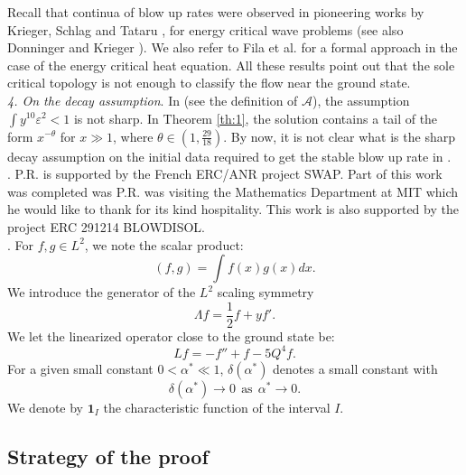 \documentclass[11pt,a4paper,reqno]{amsart}
\theoremstyle{remark}
\numberwithin{equation}{section}
\newcommand{\be}{\begin{equation}}
\newcommand{\ee}{\end{equation}}
\def\e{\varepsilon}
\begin{document}
Recall that continua of blow up rates were   observed in   pioneering works by Krieger, Schlag and Tataru \cite{KST}, \cite{KST2} for   energy critical wave problems (see also Donninger and Krieger \cite{DK}). We also refer to Fila et al. \cite{FKWY} for a   formal approach in the case of the energy critical heat equation. All these results point out that the sole critical topology is not enough to classify the flow near the ground state.\\

{\it 4. On the   decay assumption}. In \cite{MMR1} (see the definition of $\mathcal A$), the assumption $\int y^{10} \e^2<1$ is not sharp.
In Theorem \ref{th:1}, the solution contains a tail  of the form $x^{-\theta}$ for $x\gg 1$, where $\theta\in(1,\frac {29}{18})$. By now, it is not clear what is the sharp decay assumption on the initial data required to get  the stable blow up rate in \cite{MMR1}.\\


. P.R. is supported by the French ERC/ANR project SWAP. Part of this work was completed was P.R. was visiting the Mathematics Department at MIT which he would like to thank for its kind hospitality. This work is also supported by the project ERC 291214 BLOWDISOL.\\

 
. 
For $f,g\in L^2$, we note the scalar product: $$(f,g)=\int f(x)g(x)dx.$$ We introduce the generator of the $L^2$ scaling symmetry $$ \Lambda f=\frac12f+yf'. $$ We let the linearized operator close to the ground state be:
\be\label{deflplus}  
Lf=-f''+f-5Q^4f.
\ee  
 For a given  small constant $0<\alpha^*\ll1 $,  $\delta(\alpha^*)$ denotes a   small constant with $$\delta(\alpha^*)\to 0\ \ \mbox{as}\ \ \alpha^*\to 0.$$ We denote by  ${\mathbf{1}}_I$   the characteristic function of the interval $I$.


\subsection{Strategy of the proof}\label{strategy} 
\label{vneovnoen}
\end{document}

